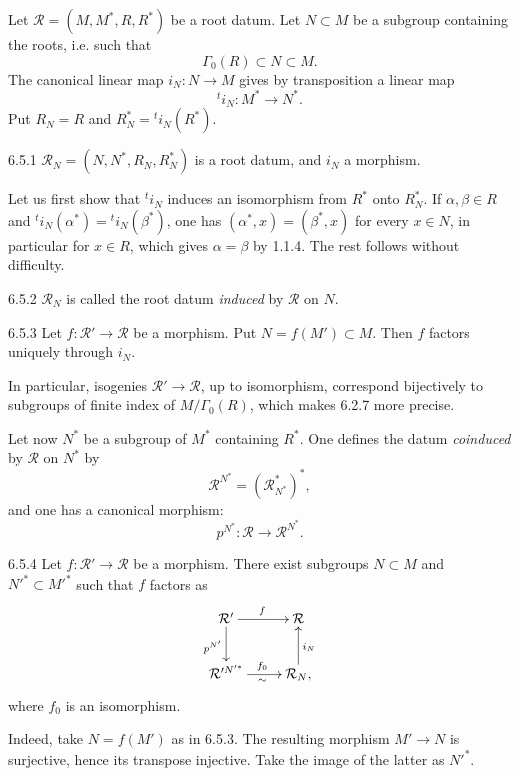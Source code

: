 Let $\mathcal R=(M,M^*,R,R^*)$ be a root datum. Let $N\subset M$ be a subgroup containing the roots, i.e. such that
\[
\Gamma_0(R)\subset N\subset M.
\]
The canonical linear map $i_N:N\to M$ gives by transposition a linear map
\[
{}^ti_N:M^*\to N^*.
\]
Put $R_N=R$ and $R_N^*={}^ti_N(R^*)$.
\begin{lemma}{6.5.1}\label{XXI.6.5.1}
$\mathcal R_N=(N,N^*,R_N,R_N^*)$ is a root datum, and $i_N$ a morphism.
\end{lemma}
Let us first show that ${}^ti_N$ induces an isomorphism from $R^*$ onto $R_N^*$. If $\alpha,\beta\in R$ and ${}^ti_N(\alpha^*)={}^ti_N(\beta^*)$, one has $(\alpha^*,x)=(\beta^*,x)$ for every $x\in N$, in particular for $x\in R$, which gives $\alpha=\beta$ by 1.1.4. The rest follows without difficulty.
\begin{definition}{6.5.2}\label{XXI.6.5.2}
$\mathcal R_N$ is called the root datum \emph{induced} by $\mathcal R$ on $N$.
\end{definition}
\begin{lemma}{6.5.3}\label{XXI.6.5.3}
Let $f:\mathcal R'\to\mathcal R$ be a morphism. Put $N=f(M')\subset M$. Then $f$ factors uniquely through $i_N$.
\end{lemma}
In particular, isogenies $\mathcal R'\to\mathcal R$, up to isomorphism, correspond bijectively to subgroups of finite index of $M/\Gamma_0(R)$, which makes 6.2.7 more precise.

Let now $N^*$ be a subgroup of $M^*$ containing $R^*$. One defines the datum \emph{coinduced} by $\mathcal R$ on $N^*$ by
\[
\mathcal R^{N^*}=(\mathcal R^*_{N^*})^*,
\]
and one has a canonical morphism:
\[
p^{N^*}:\mathcal R\to\mathcal R^{N^*}.
\]
\begin{lemma}{6.5.4}\label{XXI.6.5.4}
Let $f:\mathcal R'\to\mathcal R$ be a morphism. There exist subgroups $N\subset M$ and $N'^*\subset M'^*$ such that $f$ factors as
\[
\xymatrix{\mathcal R'\ar[r]^f\ar[d]_{p^{N'}}&\mathcal R\\
\mathcal R'^{N'^*}\ar[r]^{f_0}_{\sim}&\mathcal R_N\ar[u]_{i_N},}
\]
where $f_0$ is an isomorphism.
\end{lemma}
Indeed, take $N=f(M')$ as in 6.5.3. The resulting morphism $M'\to N$ is surjective, hence its transpose injective. Take the image of the latter as $N'^*$.

